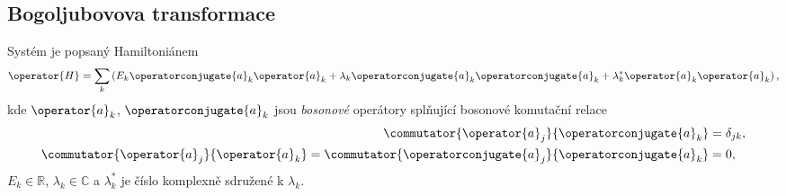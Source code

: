 \subsection{Bogoljubovova transformace}
Systém je popsaný Hamiltoniánem
\begin{equation}
    \operator{H}=\sum_{k}\left(E_{k}\operatorconjugate{a}_{k}\operator{a}_{k}+\lambda_{k}\operatorconjugate{a}_{k}\operatorconjugate{a}_{k}+\lambda_{k}^{*}\operator{a}_{k}\operator{a}_{k}\right),
\end{equation}
kde $\operator{a}_{k}$, $\operatorconjugate{a}_{k}$ jsou \emph{bosonové} operátory splňující bosonové komutační relace
\begin{subequations}
    \begin{align}
        \commutator{\operator{a}_{j}}{\operatorconjugate{a}_{k}}&=\delta_{jk},\\
        \commutator{\operator{a}_{j}}{\operator{a}_{k}}=\commutator{\operatorconjugate{a}_{j}}{\operatorconjugate{a}_{k}}&=0,
    \end{align}        
\end{subequations}
$E_{k}\in\mathbb{R}$, $\lambda_{k}\in\mathbb{C}$ a $\lambda_{k}^{*}$ je číslo komplexně sdružené k $\lambda_{k}$.

